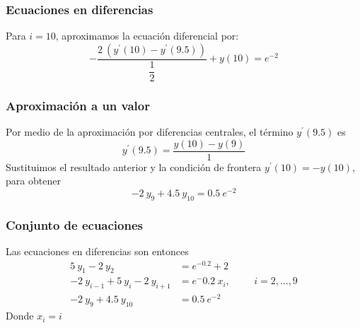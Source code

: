 \begin{frame}
\frametitle{Ecuaciones en diferencias}
Para $i = 10$, aproximamos la ecuación diferencial por:
\[ - \dfrac{2 \: (y^{\prime}(10)- y^{\prime}(9.5))}{\dfrac{1}{2}} + y(10) = e^{-2}\]
\end{frame}
\begin{frame}
\frametitle{Aproximación a un valor}
Por medio de la aproximación por diferencias centrales, el término $y^{\prime}(9.5)$ es
\[ y^{\prime}(9.5) = \dfrac{y(10) - y(9)}{1}\]
\pause
Sustituimos el resultado anterior y la condición de frontera $y^{\prime}(10) = -y(10)$, para obtener
\[ -2 \: y_{9} + 4.5 \: y_{10} =  0.5 \:  e^{-2} \]
\end{frame}
\begin{frame}
\frametitle{Conjunto de ecuaciones}
Las ecuaciones en diferencias son entonces
\[ \begin{split}
5 \: y_{1} - 2 \: y_{2} &= e^{-0.2} + 2 \\
-2 \: y_{i - 1} + 5 \: y_{i} - 2 \: y_{i + 1} &= e^-0.2 \: x_{i}, \hspace{1cm} i = 2, \ldots, 9 \\
-2 \: y_{9} + 4.5 \: y_{10} &= 0.5 \: e^{-2}
\end{split} \]
Donde $x_{i} = i$
\end{frame}
